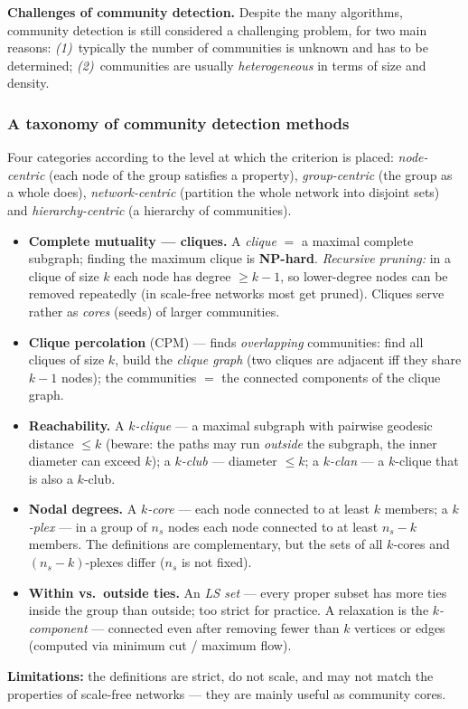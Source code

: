 \documentclass[11pt,a4paper]{article}
\theoremstyle{definition}
\begin{document}
\textbf{Challenges of community detection.} Despite the many algorithms, community detection is still
considered a challenging problem, for two main reasons: \emph{(1)}~typically the number of communities
is unknown and has to be determined; \emph{(2)}~communities are usually \emph{heterogeneous} in terms
of size and density.

\subsubsection{A taxonomy of community detection methods}

Four categories according to the level at which the criterion is placed: \emph{node-centric}
(each node of the group satisfies a property), \emph{group-centric} (the group as a whole
does), \emph{network-centric} (partition the whole network into disjoint sets) and
\emph{hierarchy-centric} (a hierarchy of communities).

\begin{defbox}
\begin{itemize}
\item \textbf{Complete mutuality --- cliques.} A \emph{clique} $=$ a maximal complete
      subgraph; finding the maximum clique is \textbf{NP-hard}. \emph{Recursive pruning:} in
      a clique of size $k$ each node has degree $\ge k-1$, so lower-degree nodes can be
      removed repeatedly (in scale-free networks most get pruned). Cliques serve rather as
      \emph{cores} (seeds) of larger communities.
\item \textbf{Clique percolation} (CPM) --- finds \emph{overlapping} communities: find all
      cliques of size $k$, build the \emph{clique graph} (two cliques are adjacent iff they
      share $k-1$ nodes); the communities $=$ the connected components of the clique graph.
\item \textbf{Reachability.} A \emph{$k$-clique} --- a maximal subgraph with pairwise
      geodesic distance $\le k$ (beware: the paths may run \emph{outside} the subgraph, the
      inner diameter can exceed $k$); a \emph{$k$-club} --- diameter $\le k$; a
      \emph{$k$-clan} --- a $k$-clique that is also a $k$-club.
\item \textbf{Nodal degrees.} A \emph{$k$-core} --- each node connected to at least $k$
      members; a \emph{$k$-plex} --- in a group of $n_s$ nodes each node connected to at
      least $n_s-k$ members. The definitions are complementary, but the sets of all
      $k$-cores and $(n_s-k)$-plexes differ ($n_s$ is not fixed).
\item \textbf{Within vs.\ outside ties.} An \emph{LS set} --- every proper subset has more
      ties inside the group than outside; too strict for practice. A relaxation is the
      \emph{$k$-component} --- connected even after removing fewer than $k$ vertices or
      edges (computed via minimum cut / maximum flow).
\end{itemize}
\textbf{Limitations:} the definitions are strict, do not scale, and may not match the
properties of scale-free networks --- they are mainly useful as community cores.
\end{defbox}
\end{document}
